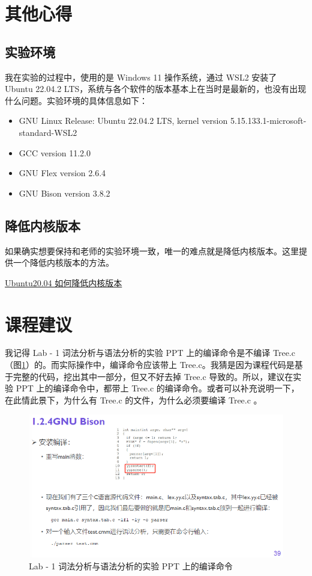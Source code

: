 \documentclass{article}
\begin{document}
\section{其他心得}

\subsection{实验环境}
我在实验的过程中，使用的是 Windows 11 操作系统，通过 WSL2 安装了 Ubuntu 22.04.2 LTS，系统与各个软件的版本基本上在当时是最新的，也没有出现什么问题。实验环境的具体信息如下：

\begin{itemize}
    \item GNU Linux Release: Ubuntu 22.04.2 LTS, kernel version 5.15.133.1-microsoft-standard-WSL2
    \item GCC version 11.2.0
    \item GNU Flex version 2.6.4
    \item GNU Bison version 3.8.2
\end{itemize}

\subsection{降低内核版本}
如果确实想要保持和老师的实验环境一致，唯一的难点就是降低内核版本。这里提供一个降低内核版本的方法。

\href{https://blog.csdn.net/qq_49814035/article/details/116035670}{Ubuntu20.04 如何降低内核版本}

\section{课程建议}
我记得 Lab - 1 词法分析与语法分析的实验 PPT 上的编译命令是不编译 Tree.c （图\ref{fig:lab1}）的。而实际操作中，编译命令应该带上 Tree.c。我猜是因为课程代码是基于完整的代码，挖出其中一部分，但又不好去掉 Tree.c 导致的。所以，建议在实验 PPT 上的编译命令中，都带上 Tree.c 的编译命令。或者可以补充说明一下，在此情此景下，为什么有 Tree.c 的文件，为什么必须要编译 Tree.c 。

\begin{figure}[h]
    \centering
    \includegraphics[width=1\textwidth]{pic/lab1.png}
    \caption{Lab - 1 词法分析与语法分析的实验 PPT 上的编译命令}
    \label{fig:lab1}
\end{figure}
\end{document}
